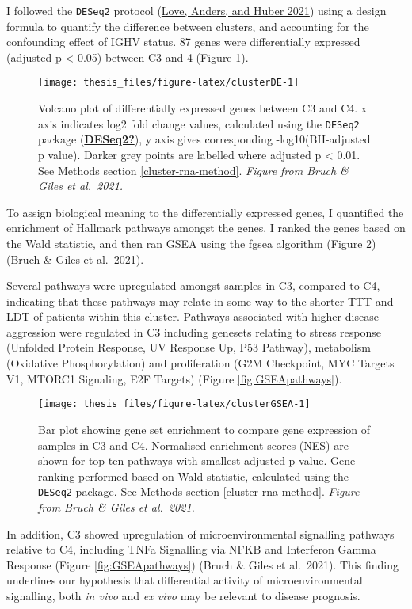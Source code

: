 \documentclass[11pt, a4paper, twosided]{book}
\begin{document}
I followed the \texttt{DESeq2} protocol (\protect\hyperlink{ref-R-DESeq2}{Love, Anders, and Huber 2021}) using a design formula to quantify the difference between clusters, and accounting for the confounding effect of IGHV status. 87 genes were differentially expressed (adjusted p \textless{} 0.05) between C3 and 4 (Figure \ref{fig:clusterDE}).


\begin{figure}

{\centering \texttt{[image: thesis\_files/figure-latex/clusterDE-1]} 

}

\caption{Volcano plot of differentially expressed genes between C3 and C4. x axis indicates log2 fold change values, calculated using the \texttt{DESeq2} package (\protect\hyperlink{ref-DESeq2}{\textbf{DESeq2?}}), y axis gives corresponding -log10(BH-adjusted p value). Darker grey points are labelled where adjusted p \textless{} 0.01. See Methods section \ref{cluster-rna-method}. \emph{Figure from Bruch \& Giles et al.~2021.}}\label{fig:clusterDE}
\end{figure}
To assign biological meaning to the differentially expressed genes, I quantified the enrichment of Hallmark pathways amongst the genes. I ranked the genes based on the Wald statistic, and then ran GSEA using the fgsea algorithm (Figure \ref{fig:clusterGSEA}) (Bruch \& Giles et al.~2021).

Several pathways were upregulated amongst samples in C3, compared to C4, indicating that these pathways may relate in some way to the shorter TTT and LDT of patients within this cluster. Pathways associated with higher disease aggression were regulated in C3 including genesets relating to stress response (Unfolded Protein Response, UV Response Up, P53 Pathway), metabolism (Oxidative Phosphorylation) and proliferation (G2M Checkpoint, MYC Targets V1, MTORC1 Signaling, E2F Targets) (Figure \ref{fig:GSEApathways}).


\begin{figure}

{\centering \texttt{[image: thesis\_files/figure-latex/clusterGSEA-1]} 

}

\caption{Bar plot showing gene set enrichment to compare gene expression of samples in C3 and C4. Normalised enrichment scores (NES) are shown for top ten pathways with smallest adjusted p-value. Gene ranking performed based on Wald statistic, calculated using the \texttt{DESeq2} package. See Methods section \ref{cluster-rna-method}. \emph{Figure from Bruch \& Giles et al.~2021. }}\label{fig:clusterGSEA}
\end{figure}
In addition, C3 showed upregulation of microenvironmental signalling pathways relative to C4, including TNFa Signalling via NFKB and Interferon Gamma Response (Figure \ref{fig:GSEApathways}) (Bruch \& Giles et al.~2021). This finding underlines our hypothesis that differential activity of microenvironmental signalling, both \emph{in vivo} and \emph{ex vivo} may be relevant to disease prognosis.
\end{document}
